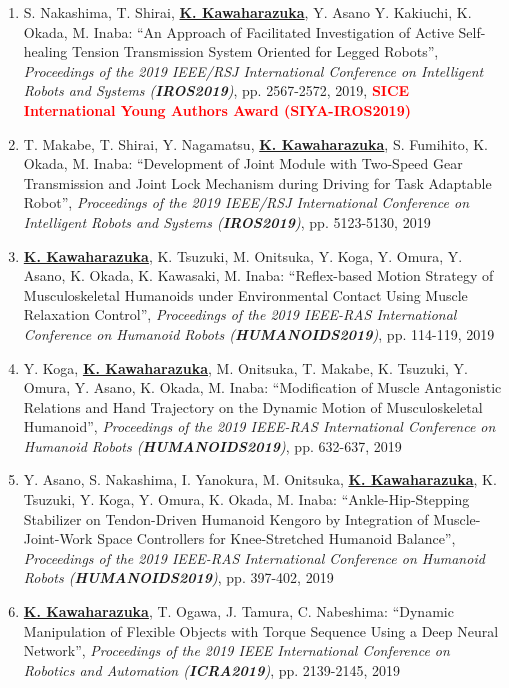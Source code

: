 \documentclass[letterpaper]{article}
\begin{document}
\begin{enumerate}
\item S. Nakashima, T. Shirai, \underline{\textbf{K. Kawaharazuka}}, Y. Asano Y. Kakiuchi, K. Okada, M. Inaba: ``An Approach of Facilitated Investigation of Active Self-healing Tension Transmission System Oriented for Legged Robots'', \textit{Proceedings of the 2019 IEEE/RSJ International Conference on Intelligent Robots and Systems (\textit{\textbf{IROS2019}})}, pp. 2567-2572, 2019, \textbf{\textcolor{red}{SICE International Young Authors Award (SIYA-IROS2019)}}
\item T. Makabe, T. Shirai, Y. Nagamatsu, \underline{\textbf{K. Kawaharazuka}}, S. Fumihito, K. Okada, M. Inaba: ``Development of Joint Module with Two-Speed Gear Transmission and Joint Lock Mechanism during Driving for Task Adaptable Robot'', \textit{Proceedings of the 2019 IEEE/RSJ International Conference on Intelligent Robots and Systems (\textit{\textbf{IROS2019}})}, pp. 5123-5130, 2019
\item \underline{\textbf{K. Kawaharazuka}}, K. Tsuzuki, M. Onitsuka, Y. Koga, Y. Omura, Y. Asano, K. Okada, K. Kawasaki, M. Inaba: ``Reflex-based Motion Strategy of Musculoskeletal Humanoids under Environmental Contact Using Muscle Relaxation Control'', \textit{Proceedings of the 2019 IEEE-RAS International Conference on Humanoid Robots (\textit{\textbf{HUMANOIDS2019}})}, pp. 114-119, 2019
\item Y. Koga, \underline{\textbf{K. Kawaharazuka}}, M. Onitsuka, T. Makabe, K. Tsuzuki, Y. Omura, Y. Asano, K. Okada, M. Inaba: ``Modification of Muscle Antagonistic Relations and Hand Trajectory on the Dynamic Motion of Musculoskeletal Humanoid'', \textit{Proceedings of the 2019 IEEE-RAS International Conference on Humanoid Robots (\textit{\textbf{HUMANOIDS2019}})}, pp. 632-637, 2019
\item Y. Asano, S. Nakashima, I. Yanokura, M. Onitsuka, \underline{\textbf{K. Kawaharazuka}}, K. Tsuzuki, Y. Koga, Y. Omura, K. Okada, M. Inaba: ``Ankle-Hip-Stepping Stabilizer on Tendon-Driven Humanoid Kengoro by Integration of Muscle-Joint-Work Space Controllers for Knee-Stretched Humanoid Balance'', \textit{Proceedings of the 2019 IEEE-RAS International Conference on Humanoid Robots (\textit{\textbf{HUMANOIDS2019}})}, pp. 397-402, 2019
\item \underline{\textbf{K. Kawaharazuka}}, T. Ogawa, J. Tamura, C. Nabeshima: ``Dynamic Manipulation of Flexible Objects with Torque Sequence Using a Deep Neural Network'', \textit{Proceedings of the 2019 IEEE International Conference on Robotics and Automation (\textit{\textbf{ICRA2019}})}, pp. 2139-2145, 2019

\end{enumerate}
\end{document}
